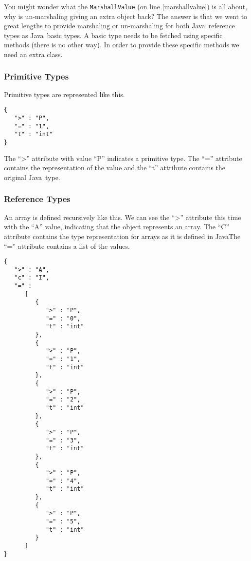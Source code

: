 \documentclass[a4paper]{article}
\newcommand{\java}{Java}
\begin{document}
You might wonder what the \lstinline{MarshallValue} (on line \ref{marshallvalue}) is all about, why is un-marshaling giving an extra object back? The answer is that we went to great lengths to provide marshaling or un-marshaling for both \java\ reference types as \java\ basic types. A basic type needs to be fetched using specific methods (there is no other way). In order to provide these specific methods we need an extra class.

\subsubsection{Primitive Types}

Primitive types are represented like this.

\medskip
\begin{lstlisting}
{
   ">" : "P",
   "=" : "1",
   "t" : "int"
}
\end{lstlisting}
\medskip

The ``>''  attribute with value ``P''  indicates a primitive type. The ``=''  attribute contains the representation of the value and the ``t'' attribute contains the original \java\ type.

\subsubsection{Reference Types}

An array is defined recursively like this. We can see the ``>'' attribute this time with the ``A''  value, indicating that the object represents an array. The ``C'' attribute contains the type representation for arrays as it is defined in \java\. The ``=''  attribute contains a list of the values.

\medskip
\begin{lstlisting}
{
   ">" : "A",
   "c" : "I",
   "=" :
      [
         {
            ">" : "P",
            "=" : "0",
            "t" : "int"
         },
         {
            ">" : "P",
            "=" : "1",
            "t" : "int"
         },
         {
            ">" : "P",
            "=" : "2",
            "t" : "int"
         },
         {
            ">" : "P",
            "=" : "3",
            "t" : "int"
         },
         {
            ">" : "P",
            "=" : "4",
            "t" : "int"
         },
         {
            ">" : "P",
            "=" : "5",
            "t" : "int"
         }
      ]
}
\end{lstlisting}
\medskip
\end{document}
